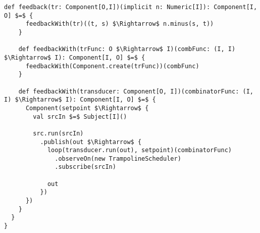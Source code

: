 \begin{lstlisting}[style=ScalaStyle, caption={Operators on \comp}, label={lst:component-operators}]
    def feedback(tr: Component[O,I])(implicit n: Numeric[I]): Component[I, O] $=$ {
      feedbackWith(tr)((t, s) $\Rightarrow$ n.minus(s, t))
    }

    def feedbackWith(trFunc: O $\Rightarrow$ I)(combFunc: (I, I) $\Rightarrow$ I): Component[I, O] $=$ {
      feedbackWith(Component.create(trFunc))(combFunc)
    }

    def feedbackWith(transducer: Component[O, I])(combinatorFunc: (I, I) $\Rightarrow$ I): Component[I, O] $=$ {
      Component(setpoint $\Rightarrow$ {
        val srcIn $=$ Subject[I]()

        src.run(srcIn)
          .publish(out $\Rightarrow$ {
            loop(transducer.run(out), setpoint)(combinatorFunc)
              .observeOn(new TrampolineScheduler)
              .subscribe(srcIn)

            out
          })
      })
    }
  }
}
\end{lstlisting}
